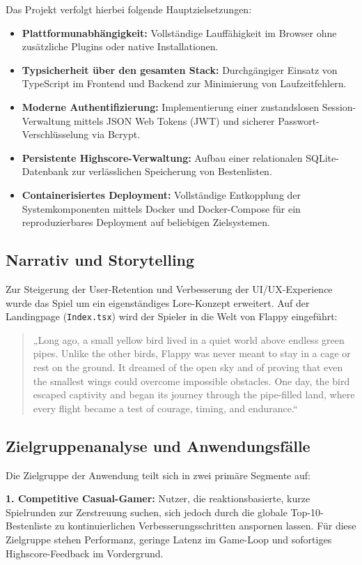 \documentclass[12pt,a4paper]{article}
\begin{document}
Das Projekt verfolgt hierbei folgende Hauptzielsetzungen:
\begin{itemize}
  \item \textbf{Plattformunabhängigkeit:} Vollständige Lauffähigkeit im Browser ohne zusätzliche Plugins oder native Installationen.
  \item \textbf{Typsicherheit über den gesamten Stack:} Durchgängiger Einsatz von TypeScript im Frontend und Backend zur Minimierung von Laufzeitfehlern.
  \item \textbf{Moderne Authentifizierung:} Implementierung einer zustandslosen Session-Verwaltung mittels JSON Web Tokens (JWT) und sicherer Passwort-Verschlüsselung via Bcrypt.
  \item \textbf{Persistente Highscore-Verwaltung:} Aufbau einer relationalen SQLite-Datenbank zur verlässlichen Speicherung von Bestenlisten.
  \item \textbf{Containerisiertes Deployment:} Vollständige Entkopplung der Systemkomponenten mittels Docker und Docker-Compose für ein reproduzierbares Deployment auf beliebigen Zielsystemen.
\end{itemize}

\subsection{Narrativ und Storytelling}
Zur Steigerung der User-Retention und Verbesserung der UI/UX-Experience wurde das Spiel um ein eigenständiges Lore-Konzept erweitert. Auf der Landingpage (\texttt{Index.tsx}) wird der Spieler in die Welt von Flappy eingeführt:

\begin{quote}
„Long ago, a small yellow bird lived in a quiet world above endless green pipes. Unlike the other birds, Flappy was never meant to stay in a cage or rest on the ground. It dreamed of the open sky and of proving that even the smallest wings could overcome impossible obstacles. One day, the bird escaped captivity and began its journey through the pipe-filled land, where every flight became a test of courage, timing, and endurance.“
\end{quote}

\subsection{Zielgruppenanalyse und Anwendungsfälle}
Die Zielgruppe der Anwendung teilt sich in zwei primäre Segmente auf:

\textbf{1. Competitive Casual-Gamer:}
Nutzer, die reaktionsbasierte, kurze Spielrunden zur Zerstreuung suchen, sich jedoch durch die globale Top-10-Bestenliste zu kontinuierlichen Verbesserungsschritten anspornen lassen. Für diese Zielgruppe stehen Performanz, geringe Latenz im Game-Loop und sofortiges Highscore-Feedback im Vordergrund.
\end{document}
